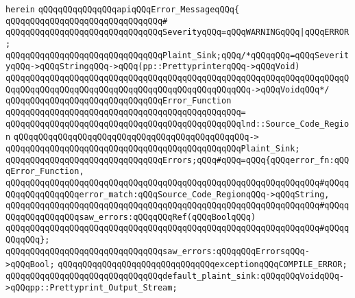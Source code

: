 \verb|herein|\newline
\newline
\verb|qQQqqQQqqQQqqQQqapiqQQqError_MessageqQQq{|\newline
\verb|qQQqqQQqqQQqqQQqqQQqqQQqqQQqqQQq#|\newline
\verb|qQQqqQQqqQQqqQQqqQQqqQQqqQQqqQQqSeverityqQQq=qQQqWARNINGqQQq|\verb#|qQQqERROR;#\newline
\newline
\verb|qQQqqQQqqQQqqQQqqQQqqQQqqQQqqQQqPlaint_Sink;qQQq/*qQQqqQQq=qQQqSeverityqQQq->qQQqStringqQQq->qQQq(pp::PrettyprinterqQQq->qQQqVoid)|\newline
\verb|qQQqqQQqqQQqqQQqqQQqqQQqqQQqqQQqqQQqqQQqqQQqqQQqqQQqqQQqqQQqqQQqqQQqqQQqqQQqqQQqqQQqqQQqqQQqqQQqqQQqqQQqqQQqqQQqqQQqqQQq->qQQqVoidqQQq*/|\newline
\newline
\verb|qQQqqQQqqQQqqQQqqQQqqQQqqQQqqQQqError_Function|\newline
\verb|qQQqqQQqqQQqqQQqqQQqqQQqqQQqqQQqqQQqqQQqqQQqqQQq=|\newline
\verb|qQQqqQQqqQQqqQQqqQQqqQQqqQQqqQQqqQQqqQQqqQQqqQQqlnd::Source_Code_Region|\newline
\verb|qQQqqQQqqQQqqQQqqQQqqQQqqQQqqQQqqQQqqQQqqQQqqQQq->|\newline
\verb|qQQqqQQqqQQqqQQqqQQqqQQqqQQqqQQqqQQqqQQqqQQqqQQqPlaint_Sink;|\newline
\newline
\verb|qQQqqQQqqQQqqQQqqQQqqQQqqQQqqQQqErrors;qQQq#qQQq=qQQq{qQQqerror_fn:qQQqError_Function,|\newline
\verb|qQQqqQQqqQQqqQQqqQQqqQQqqQQqqQQqqQQqqQQqqQQqqQQqqQQqqQQqqQQqqQQq#qQQqqQQqqQQqqQQqqQQqerror_match:qQQqSource_Code_RegionqQQq->qQQqString,|\newline
\verb|qQQqqQQqqQQqqQQqqQQqqQQqqQQqqQQqqQQqqQQqqQQqqQQqqQQqqQQqqQQqqQQq#qQQqqQQqqQQqqQQqqQQqsaw_errors:qQQqqQQqRef(qQQqBoolqQQq)|\newline
\verb|qQQqqQQqqQQqqQQqqQQqqQQqqQQqqQQqqQQqqQQqqQQqqQQqqQQqqQQqqQQqqQQq#qQQqqQQqqQQq};|\newline
\newline
\verb|qQQqqQQqqQQqqQQqqQQqqQQqqQQqqQQqsaw_errors:qQQqqQQqErrorsqQQq->qQQqBool;|\newline
\newline
\verb|qQQqqQQqqQQqqQQqqQQqqQQqqQQqqQQqexceptionqQQqCOMPILE_ERROR;|\newline
\newline
\verb|qQQqqQQqqQQqqQQqqQQqqQQqqQQqqQQqdefault_plaint_sink:qQQqqQQqVoidqQQq->qQQqpp::Prettyprint_Output_Stream;|\newline
